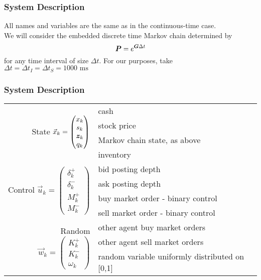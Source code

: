 \begin{frame}
\frametitle{System Description}
All names and variables are the same as in the continuous-time case. \\
\vspace{\baselineskip}
We will consider the embedded discrete time Markov chain determined by
\[ \boldsymbol{P} = e^{\boldsymbol{G}\Delta t} \]
for any time interval of size $\Delta t$. For our purposes, take $\Delta t = \Delta {t_{I}} = \Delta {t_{S}} = 1000\text{ ms}$
\end{frame}

\begin{frame}
\frametitle{System Description}
\begin{adjustbox}{width=\textwidth}
\begin{tabular}{rl}
\multirow{4}{*}{State $\vec{x}_{k} = \begin{pmatrix}
x_k \\
s_k \\
\bm{z}_k \\
q_k 
\end{pmatrix}$} & cash \\
& stock price \\
& Markov chain state, as above \\
& inventory \\[4ex]
\multirow{4}{*}{Control $\vec{u}_{k} = \begin{pmatrix}
\delta_k^+ \\
\delta_k^- \\
M_k^+ \\
M_k^-
\end{pmatrix}$} & bid posting depth \\
& ask posting depth \\
& buy market order - binary control \\
& sell market order - binary control \\[4ex]
\multirow{3}{*}{
Random $\vec{w}_{k} = \begin{pmatrix}
K_k^+ \\
K_k^- \\
\omega_k
\end{pmatrix}$}
& other agent buy market orders \\
& other agent sell market orders \\
& random variable uniformly distributed on [0,1]
\end{tabular}
\end{adjustbox}
\end{frame}

